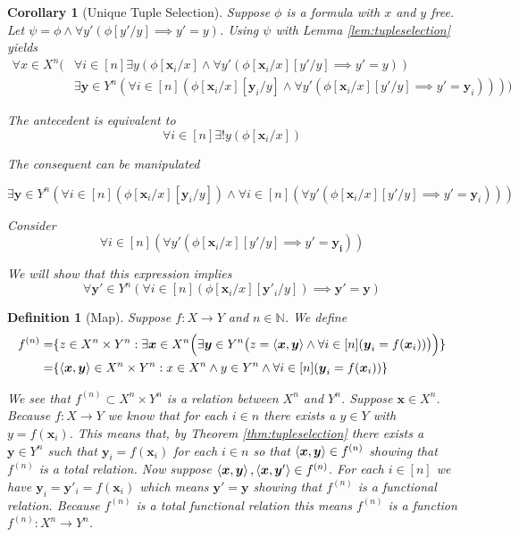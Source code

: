 \documentclass[12pt]{article}
\theoremstyle{break}
\newtheorem{definition}{Definition}[section]
\theoremstyle{break}
\theoremstyle{break}
\newtheorem{corollary}[theorem]{Corollary}
\theoremstyle{break}
\theoremstyle{break}
\newtheorem{informal definition}[definition]{Informal Definition}
\newcommand{\bv}[1]{\boldsymbol{#1}}
\begin{document}
\begin{corollary}[Unique Tuple Selection]
Suppose $\phi$ is a formula with $x$ and $y$ free.
Let $\psi = \phi \land \forall y' (\phi[y'/y] \implies y'=y)$.
Using $\psi$ with Lemma \ref{lem:tupleselection} yields
\begin{align*}
\forall x \in X^n \big(& \forall i \in [n] \exists y(\phi[\bv{x}_i/x] \land \forall y' (\phi[\bv{x}_i/x][y'/y] \implies y'=y))\\
& \exists \bv{y}\in Y^n(\forall i \in [n](\phi[\bv{x}_i/x][\bv{y}_i/y] \land \forall y' (\phi[\bv{x}_i/x][y'/y] \implies y'=\bv{y}_i))) \big)
\end{align*}

The antecedent is equivalent to
$$
\forall i \in [n] \exists!y (\phi[\bv{x}_i/x])
$$

The consequent can be manipulated

$$
\exists \bv{y} \in Y^n (\forall i \in [n](\phi[\bv{x}_i/x][\bv{y}_i/y])\land \forall i\in [n](\forall y'(\phi[\bv{x}_i/x][y'/y] \implies y'=\bv{y}_i)))
$$

Consider
$$
\forall i \in [n] (\forall y' (\phi[\bv{x}_i/x][y'/y] \implies y' = \bv{y_i}))
$$

We will show that this expression implies
$$
\forall \bv{y}' \in Y^n (\forall i \in [n](\phi[\bv{x}_i/x][\bv{y}'_i/y]) \implies \bv{y}' = \bv{y})
$$

\end{corollary}

\begin{definition}[Map]
Suppose $f:X \to Y$ and $n\in \mathbb{N}$.
We define
\begin{align}
f^{(n)} =& \{z \in X^n \times Y^n: \exists \bv{x} \in X^n \Big(\exists \bv{y} \in Y^n \big(z=\braket{\bv{x}, \bv{y}} \land \forall i \in [n]( \bv{y}_i = f(\bv{x}_i))\big)\Big)\}\\
=& \{\braket{\bv{x}, \bv{y}} \in X^n \times Y^n: x\in X^n \land y \in Y^n \land \forall i \in [n] (\bv{y}_i = f(\bv{x}_i))\}
\end{align}

We see that $f^{(n)}\subset X^n \times Y^n$ is a relation between $X^n$ and $Y^n$.
Suppose $\boldsymbol{x}\in X^n$.
Because $f:X \to Y$ we know that for each $i\in n$ there exists a $y\in Y$ with $y=f(\bv{x}_i)$.
This means that, by Theorem \ref{thm:tupleselection} there exists a $\bv{y}\in Y^n$ such that $\bv{y}_i = f(\bv{x}_i)$ for each $i\in n$ so that $\braket{\bv{x}, \bv{y}}\in f^{(n)}$ showing that $f^{(n)}$ is a total relation.
Now suppose $\braket{\bv{x}, \bv{y}}, \braket{\bv{x}, \bv{y}'} \in f^{(n)}$.
For each $i \in [n]$ we have $\bv{y}_i = \bv{y}'_i = f(\bv{x}_i)$ which means $\bv{y}' = \bv{y}$ showing that $f^{(n)}$ is a functional relation.
Because $f^{(n)}$ is a total functional relation this means $f^{(n)}$ is a function $f^{(n)}:X^n \to Y^n$.
\end{definition}
\end{document}
